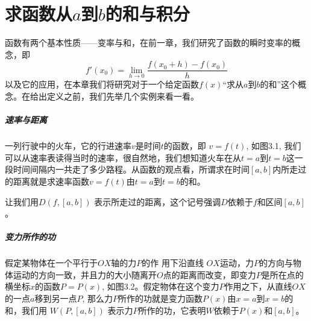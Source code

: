 \chapter{求函数从$a$到$b$的和与积分}
函数有两个基本性质——变率与和，在前一章，我们研究了函数的瞬时变率的概念，即
\[f'(x_0) =\lim_{h\to 0} \frac{f (x_0+h) -f (x_0)}{h}\]
以及它的应用，在本章我们将研究对于一个给定函数$f(x)$“求从$a$到$b$的和”这个概念。在给出定义之前，我们先举几个实例来看一看。

\paragraph{速率与距离} 
一列行驶中的火车，它的行进速率$v$是时间$t$的函数，即
$v=f(t)$, 如图3.1, 我们可以从速率表读得当时的速率，很自然地，我们想知道火车在从$t=a$到$t=b$这一段时间间隔内一共走了多少路程。从函数的观点看，所谓求在时间$[a,b]$内所走过的距离就是求速率函数$v=f(t)$由$t=a$到$t=b$的和。

\begin{figure}[htp]
    \centering

    \caption{}
\end{figure}

让我们用$D(f,[a,b])$
表示所走过的距离，这个记号强调$D$依赖于$f$和区间$[a,b]$。

\paragraph{变力所作的功}

假定某物体在一个平行于$OX$轴的力$P$的作 用下沿直线
$OX$运动，力$P$的方向与物体运动的方向一致，并且力的大小随离开$O$点的距离而改变，即变力$P$是所在点的横坐标$x$的函数$P=P(x)$, 如图3.2。假定物体在这个变力$P$作用之下，从直线$OX$的一点$a$移到另一点$P$, 那么力$P$所作的功就是变力函数$P(x)$由$x=a$到$x=b$的和，我们用
$W (P, [a,b])$
表示力$P$所作的功，它表明$W$依赖于$P(x)$和$[a,b]$。


